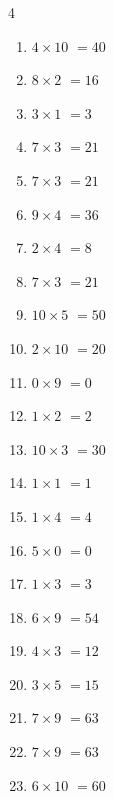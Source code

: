 \begin{multicols}{4}
\begin{enumerate}
  \item $4\times 10$
        $=40$

  \item $8\times 2$
        $=16$

  \item $3\times 1$
        $=3$

  \item $7\times 3$
        $=21$

  \item $7\times 3$
        $=21$

  \item $9\times 4$
        $=36$

  \item $2\times 4$
        $=8$

  \item $7\times 3$
        $=21$

  \item $10\times 5$
        $=50$

\columnbreak %

  \item $2\times 10$
        $=20$

  \item $0\times 9$
        $=0$

  \item $1\times 2$
        $=2$

  \item $10\times 3$
        $=30$

  \item $1\times 1$
        $=1$

  \item $1\times 4$
        $=4$

  \item $5\times 0$
        $=0$

  \item $1\times 3$
        $=3$

  \item $6\times 9$
        $=54$

  \item $4\times 3$
        $=12$

  \item $3\times 5$
        $=15$

  \item $7\times 9$
        $=63$

  \item $7\times 9$
        $=63$

  \item $6\times 10$
        $=60$


\end{enumerate}
\end{multicols}
